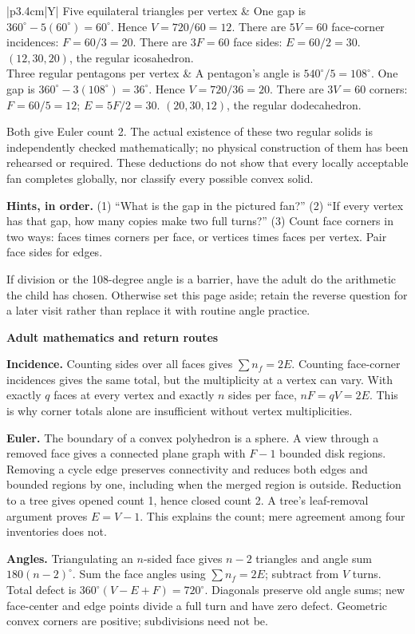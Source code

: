 \documentclass[11pt,letterpaper]{article}
\newcommand{\titleline}[1]{\par{\Large\bfseries #1}\par\vspace{4pt}}
\newcommand{\sub}[1]{\par\vspace{3pt}{\bfseries #1}\par}
\newcommand{\hints}[3]{\textbf{Hints, in order.} (1) #1 (2) #2 (3) #3\par}
\newcommand{\degc}{^{\circ}}
\begin{document}
\begin{tabularx}{\linewidth}{|p{3.4cm}|Y|}\hline
Five equilateral triangles per vertex & One gap is $360\degc-5(60\degc)=60\degc$. Hence $V=720/60=12$. There are $5V=60$ face-corner incidences: $F=60/3=20$. There are $3F=60$ face sides: $E=60/2=30$. \textbf{$(12,30,20)$}, the regular icosahedron.\\\hline
Three regular pentagons per vertex & A pentagon's angle is $540\degc/5=108\degc$. One gap is $360\degc-3(108\degc)=36\degc$. Hence $V=720/36=20$. There are $3V=60$ corners: $F=60/5=12$; $E=5F/2=30$. \textbf{$(20,30,12)$}, the regular dodecahedron.\\\hline
\end{tabularx}
Both give Euler count 2. The actual existence of these two regular solids is independently checked mathematically; no physical construction of them has been rehearsed or required. These deductions do not show that every locally acceptable fan completes globally, nor classify every possible convex solid.

\hints{``What is the gap in the pictured fan?''}{``If every vertex has that gap, how many copies make two full turns?''}{Count face corners in two ways: faces times corners per face, or vertices times faces per vertex. Pair face sides for edges.}
If division or the 108-degree angle is a barrier, have the adult do the arithmetic the child has chosen. Otherwise set this page aside; retain the reverse question for a later visit rather than replace it with routine angle practice.

\newpage
\titleline{Adult mathematics and return routes}
\sub{A compact map of the proofs}
\textbf{Incidence.} Counting sides over all faces gives $\sum n_f=2E$. Counting face-corner incidences gives the same total, but the multiplicity at a vertex can vary. With exactly $q$ faces at every vertex and exactly $n$ sides per face, $nF=qV=2E$. This is why corner totals alone are insufficient without vertex multiplicities.

\textbf{Euler.} The boundary of a convex polyhedron is a sphere. A view through a removed face gives a connected plane graph with $F-1$ bounded disk regions. Removing a cycle edge preserves connectivity and reduces both edges and bounded regions by one, including when the merged region is outside. Reduction to a tree gives opened count 1, hence closed count 2. A tree's leaf-removal argument proves $E=V-1$. This explains the count; mere agreement among four inventories does not.

\textbf{Angles.} Triangulating an $n$-sided face gives $n-2$ triangles and angle sum $180(n-2)\degc$. Sum the face angles using $\sum n_f=2E$; subtract from $V$ turns. Total defect is $360\degc(V-E+F)=720\degc$. Diagonals preserve old angle sums; new face-center and edge points divide a full turn and have zero defect. Geometric convex corners are positive; subdivisions need not be.
\end{document}
